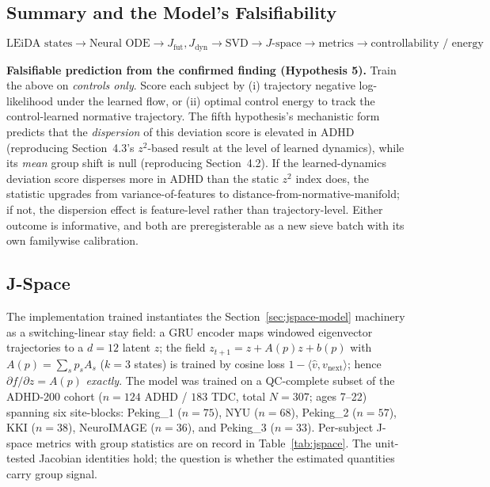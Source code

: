\documentclass{article}
\begin{document}
\subsection{Summary and the Model's Falsifiability}

\begin{equation}
\boxed{
\text{LEiDA states}
\rightarrow
\text{Neural ODE}
\rightarrow
J_{\mathrm{fut}},J_{\mathrm{dyn}}
\rightarrow
\text{SVD}
\rightarrow
J\text{-space}
\rightarrow
\text{metrics}
\rightarrow
\text{controllability / energy}
}
\end{equation}

\textbf{Falsifiable prediction from the confirmed finding (Hypothesis 5).} Train the above on \emph{controls only}. Score each subject by (i) trajectory negative log-likelihood under the learned flow, or (ii) optimal control energy to track the control-learned normative trajectory. The fifth hypothesis's mechanistic form predicts that the \emph{dispersion} of this deviation score is elevated in ADHD (reproducing Section~4.3's $z^2$-based result at the level of learned dynamics), while its \emph{mean} group shift is null (reproducing Section~4.2). If the learned-dynamics deviation score disperses more in ADHD than the static $z^2$ index does, the statistic upgrades from variance-of-features to distance-from-normative-manifold; if not, the dispersion effect is feature-level rather than trajectory-level. Either outcome is informative, and both are preregisterable as a new sieve batch with its own familywise calibration.

\subsection{J-Space}

The implementation trained instantiates the Section~\ref{sec:jspace-model} machinery as a switching-linear stay field: a GRU encoder maps windowed eigenvector trajectories to a $d{=}12$ latent $z$; the field $z_{t+1}=z+A(p)z+b(p)$ with $A(p)=\sum_s p_s A_s$ ($k{=}3$ states) is trained by cosine loss $1-\langle\hat{v},v_{\mathrm{next}}\rangle$; hence $\partial f/\partial z = A(p)$ \emph{exactly}. The model was trained on a QC-complete subset of the ADHD-200 cohort ($n{=}124$ ADHD / $183$ TDC, total $N{=}307$; ages 7--22) spanning six site-blocks: Peking\_1 ($n{=}75$), NYU ($n{=}68$), Peking\_2 ($n{=}57$), KKI ($n{=}38$), NeuroIMAGE ($n{=}36$), and Peking\_3 ($n{=}33$). Per-subject J-space metrics with group statistics are on record in Table~\ref{tab:jspace}. The unit-tested Jacobian identities hold; the question is whether the estimated quantities carry group signal.
\end{document}
